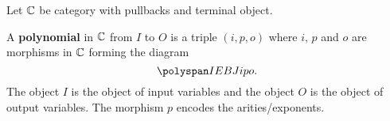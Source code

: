 Let $\mathbb{C}$ be category with pullbacks and terminal object.

\begin{definition}\label{defn:Polynomial}
   \leanok
  A \textbf{polynomial} in $\mathbb{C}$ from $I$ to $O$ is a triple $(i,p,o)$ where
  $i$, $p$ and $o$ are morphisms in $\mathbb{C}$ forming the diagram
  $$\polyspan IEBJipo.$$
  The object $I$ is the object of input variables and the object $O$ is the object of output
  variables. The morphism $p$ encodes the arities/exponents.
  \end{definition}


